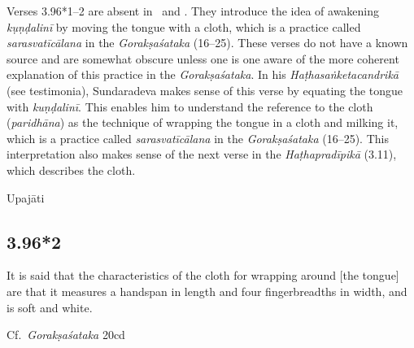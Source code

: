 \begin{ekdosis}
\begin{philcomm}[hp03_096_1]
Verses 3.96*1–2 are absent in \alphaOne\ and \alphaTwo. They introduce the idea of awakening \emph{kụṇḍalinī} by moving the tongue with a cloth, which is a practice called \emph{sarasvatīcālana} in the \emph{Gorakṣaśataka} (16–25). These verses do not have a known source and are somewhat obscure unless one is one aware of the more coherent explanation of this practice in the \emph{Gorakṣaśataka}. In his \emph{Haṭhasaṅketacandrikā} (see testimonia), Sundaradeva makes sense of this verse by equating the tongue with \emph{kuṇḍalinī}. This enables him to understand the reference to the cloth (\emph{paridhāna}) as the technique of wrapping the tongue in a cloth and milking it, which is a practice called \emph{sarasvatīcālana} in the \emph{Gorakṣaśataka} (16–25). This interpretation also makes sense of the next verse in the \emph{Haṭhapradīpikā} (3.11), which describes the cloth.


\end{philcomm}

\begin{metre}[hp03_096_1]
Upajāti
\end{metre}

\subsection*{3.96*2}
\begin{translation}[hp03_096_2]
It is said that the characteristics of the cloth for wrapping around [the tongue] are  that it measures a handspan in length and four fingerbreadths in width, and is soft and white.
\end{translation}

\begin{sources}[hp03_096_2]
Cf.~\emph{Gorakṣaśataka} 20cd
\begin{versinnote}
\end{versinnote}
\end{sources}


\end{ekdosis}
